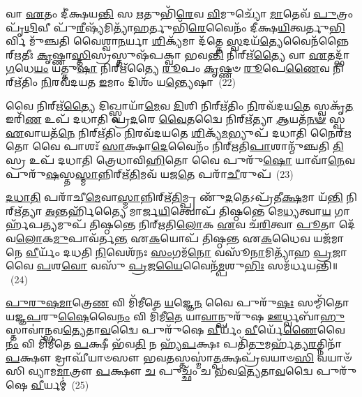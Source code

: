𑌵𑌾 \ul{𑌏}\-𑌤𑌂 𑌦𑍀॑𑌕𑍍𑌷𑌯\-\ul{𑌨𑍍𑌤𑌿} 𑌸 \ul{𑌋}\-𑌤𑍁𑌭𑌿᳴\-\ul{𑌰𑍇}\-𑌵 \ul{𑌵𑌿}\-𑌮𑍁𑌚𑍍𑌯𑍋᳴ \ul{𑌮𑌾}\-𑌤𑍇𑌵᳴ \ul{𑌪𑍁}\-𑌤𑍍𑌰𑌂 𑌪𑍃᳴\-\ul{𑌥𑌿}\-𑌵𑍀 𑌪𑍁᳴\-\ul{𑌰𑍀}\-𑌷𑍍𑌯᳴𑌮𑌿𑌤𑍍𑌯𑌾᳴\-\ul{𑌹}\-𑌰𑍍𑌤𑍁𑌭𑌿᳴\-\ul{𑌰𑍇}\-𑌵𑍈𑌨𑌂᳴ 𑌦𑍀𑌕𑍍𑌷\-\ul{𑌯𑌿}\-𑌤𑍍𑌵𑌰𑍍𑌤𑍁\-\ul{𑌭𑌿}\-𑌰𑍍𑌵𑌿 𑌮𑍁᳴𑌞𑍍𑌚𑌤𑌿 𑌵𑍈𑌶𑍍𑌵𑌾\-\ul{𑌨}\-𑌰𑍍𑌯𑌾 \ul{𑌶𑌿}\-𑌕𑍍𑌯᳴𑌮𑌾 𑌦᳴𑌤𑍍𑌤𑍇 \ul{𑌸𑍍𑌵}\-𑌦𑌯᳴\-\ul{𑌤𑍍𑌯𑍇}\-𑌵𑍈𑌨᳴𑌨𑍍𑌨𑍈𑌰𑍍\mbox{}\-\ul{𑌋}\-𑌤𑍀𑌃 \ul{𑌕𑍃}\-𑌷𑍍𑌣𑌾\-\ul{𑌸𑍍𑌤𑌿}\-𑌸𑍍𑌰𑌸𑍍𑌤𑍁𑌷᳴𑌪𑌕𑍍𑌵𑌾 𑌭𑌵\-\ul{𑌨𑍍𑌤𑌿} 𑌨𑌿𑌰𑍍\mbox{}𑌋᳴\-\ul{𑌤𑍍𑌯𑍈} 𑌵𑌾 \ul{𑌏}\-𑌤𑌦𑍍𑌭𑌾᳴\-\ul{𑌗}\-𑌧𑍇\-\ul{𑌯𑌂} 𑌯𑌤𑍍𑌤𑍁\-\ul{𑌷𑌾} 𑌨𑌿𑌰𑍍\mbox{}𑌋᳴𑌤𑍍𑌯𑍈 \ul{𑌰𑍂}\-𑌪𑌂 \ul{𑌕𑍃}\-𑌷𑍍𑌣𑍞 \ul{𑌰𑍂}\-𑌪𑍇\-\ul{𑌣𑍈}\-𑌵 𑌨𑌿𑌰𑍍\mbox{}𑌋᳴𑌤𑌿𑌂 \ul{𑌨𑌿}\-𑌰𑌵᳴𑌦𑌯𑌤 \ul{𑌇}\-𑌮𑌾𑌂 𑌦𑌿𑌶𑌂᳴ 𑌯\-\ul{𑌨𑍍𑌤𑍍𑌯𑍇}\-𑌷𑌾~(22)

𑌵𑍈 𑌨𑌿𑌰𑍍\mbox{}𑌋᳴\-\ul{𑌤𑍍𑌯𑍈} 𑌦𑌿𑌖𑍍𑌸𑍍𑌵𑌾𑌯𑌾᳴\-\ul{𑌮𑍇}\-𑌵 \ul{𑌦𑌿}\-𑌶𑌿 𑌨𑌿𑌰𑍍\mbox{}𑌋᳴𑌤𑌿𑌂 \ul{𑌨𑌿}\-𑌰𑌵᳴𑌦𑌯\-\ul{𑌤𑍇} 𑌸𑍍𑌵𑌕𑍃᳴\-\ul{𑌤} 𑌇𑌰𑌿᳴\-\ul{𑌣} 𑌉𑌪᳴ 𑌦𑌧𑌾𑌤𑌿 𑌪𑍍𑌰\-\ul{𑌦}\-𑌰𑍇 \ul{𑌵𑍈}\-𑌤𑌦𑍍𑌵𑍈 𑌨𑌿𑌰𑍍\mbox{}𑌋᳴𑌤𑍍𑌯𑌾 \ul{𑌆}\-𑌯𑌤᳴\-\ul{𑌨}\-\-\ul{𑍟} 𑌸𑍍𑌵 \ul{𑌏}\-𑌵𑌾𑌯𑌤᳴\-\ul{𑌨𑍇} 𑌨𑌿𑌰𑍍\mbox{}𑌋᳴𑌤𑌿𑌂 \ul{𑌨𑌿}\-𑌰𑌵᳴𑌦𑌯𑌤𑍇 \ul{𑌶𑌿}\-𑌕𑍍𑌯᳴\-\ul{𑌮}\-𑌭𑍍𑌯𑍁𑌪᳴ 𑌦𑌧𑌾𑌤𑌿 𑌨𑍈𑌰𑍍\mbox{}\-\ul{𑌋}\-𑌤𑍋 𑌵𑍈 𑌪𑌾𑌶𑌃᳴ \ul{𑌸𑌾}\-𑌕𑍍𑌷𑌾\-\ul{𑌦𑍇}\-𑌵𑍈𑌨𑌂᳴ 𑌨𑌿𑌰𑍍\mbox{}𑌋𑌤𑌿\-\ul{𑌪𑌾}\-𑌶𑌾𑌨𑍍𑌮𑍁᳴𑌞𑍍𑌚𑌤𑌿 \ul{𑌤𑌿}\-𑌸𑍍𑌰 𑌉𑌪᳴ 𑌦𑌧𑌾𑌤𑌿 𑌤𑍍𑌰𑍇𑌧𑌾𑌵𑌿\-\ul{𑌹𑌿}\-𑌤𑍋 𑌵𑍈 𑌪𑍁𑌰𑍁᳴\-\ul{𑌷𑍋} 𑌯𑌾𑌵𑌾᳴\-\ul{𑌨𑍇}\-𑌵 𑌪𑍁𑌰𑍁᳴\-\ul{𑌷}\-𑌸𑍍𑌤\-\ul{𑌸𑍍𑌮𑌾}\-𑌨𑍍𑌨𑌿𑌰𑍍\mbox{}𑌋᳴\-\ul{𑌤𑌿}\-𑌮𑌵᳴ 𑌯𑌜\-\ul{𑌤𑍇} 𑌪𑌰𑌾᳴\-\ul{𑌚𑍀}\-𑌰𑍁𑌪᳴~(23)

\-\ul{𑌦}\-\-\ul{𑌧𑌾}\-\-\ul{𑌤𑌿} 𑌪𑌰𑌾᳴𑌚𑍀\-\ul{𑌮𑍇}\-𑌵𑌾\-\ul{𑌸𑍍𑌮𑌾}\-𑌨𑍍𑌨𑌿𑌰𑍍\mbox{}𑌋᳴\-\ul{𑌤𑌿}\-𑌮𑍍𑌪𑍍𑌰 𑌣𑍁᳴\-\ul{𑌦}\-𑌤𑍇\-𑌽𑌪𑍍𑌰᳴𑌤𑍀\-\ul{𑌕𑍍𑌷}\-𑌮𑌾 𑌯᳴\-\ul{𑌨𑍍𑌤𑌿} 𑌨𑌿𑌰𑍍\mbox{}𑌋᳴𑌤𑍍𑌯𑌾 \ul{𑌅}\-𑌨𑍍𑌤𑌰𑍍\mbox{}𑌹𑌿᳴𑌤𑍍𑌯𑍈 𑌮𑌾𑌰𑍍𑌜\-\ul{𑌯𑌿}\-𑌤𑍍𑌵𑍋𑌪᳴ 𑌤𑌿𑌷𑍍𑌠𑌨𑍍𑌤𑍇 𑌮𑍇\-\ul{𑌧𑍍𑌯}\-𑌤𑍍𑌵𑌾\-\ul{𑌯} 𑌗𑌾𑌰𑍍\mbox{}𑌹᳴𑌪\-\ul{𑌤𑍍𑌯}\-𑌮𑍁𑌪᳴ 𑌤𑌿𑌷𑍍𑌠𑌨𑍍𑌤𑍇 𑌨𑌿𑌰𑍍\mbox{}𑌋𑌤𑌿\-\ul{𑌲𑍋}\-𑌕 \ul{𑌏}\-𑌵 𑌚᳴\-\ul{𑌰𑌿}\-𑌤𑍍𑌵𑌾 \ul{𑌪𑍂}\-𑌤𑌾 𑌦𑍇᳴𑌵\-\ul{𑌲𑍋}\-𑌕\-\ul{𑌮𑍁}\-𑌪𑌾𑌵᳴𑌰𑍍𑌤\-\ul{𑌨𑍍𑌤} 𑌏\-\ul{𑌕}\-𑌯𑍋𑌪᳴ 𑌤𑌿𑌷𑍍𑌠𑌨𑍍𑌤 𑌏\-\ul{𑌕}\-𑌧𑍈𑌵 𑌯𑌜᳴𑌮𑌾𑌨𑍇 \ul{𑌵𑍀}\-𑌰𑍍𑌯𑌂᳴ 𑌦𑌧𑌤𑌿 \ul{𑌨𑌿}\-𑌵𑍇𑌶᳴𑌨𑌃 \ul{𑌸𑌂}\-𑌗𑌮᳴\-\ul{𑌨𑍋} 𑌵𑌸𑍂᳴\-\ul{𑌨𑌾}\-𑌮𑌿𑌤𑍍𑌯𑌾᳴𑌹 \ul{𑌪𑍍𑌰}\-𑌜𑌾 𑌵𑍈 \ul{𑌪}\-𑌶\-\ul{𑌵𑍋} 𑌵𑌸𑍁᳴ \ul{𑌪𑍍𑌰}\-𑌜\-\ul{𑌯𑍈}\-𑌵𑍈𑌨᳴\-\ul{𑌮𑍍𑌪}\-𑌶𑍁\-\ul{𑌭𑌿𑌃} 𑌸𑌮᳴𑌰𑍍𑌧𑌯𑌨𑍍𑌤𑌿॥~(24)

{\anuvakamend[{\-\ul{𑌋}\-𑌤𑍁𑌭𑌿᳴\-\ul{𑌰𑍇}\-𑌷𑌾 𑌪𑌰𑌾᳴\-\ul{𑌚𑍀}\-𑌰𑍁\-\ul{𑌪𑌾}\-𑌷𑍍𑌟𑌾𑌚᳴𑌤𑍍𑌵𑌾𑌰𑌿𑍞𑌶𑌚𑍍𑌚}]}%

\-\ul{𑌪𑍁}\-\-\ul{𑌰𑍁}\-\-\ul{𑌷}\-\-\ul{𑌮𑌾}\-𑌤𑍍𑌰𑍇\-\ul{𑌣} 𑌵𑌿 𑌮𑌿᳴𑌮𑍀𑌤𑍇 \ul{𑌯}\-𑌜𑍍𑌞𑍇\-\ul{𑌨} 𑌵𑍈 𑌪𑍁𑌰𑍁᳴\-\ul{𑌷𑌃} 𑌸𑌮𑍍𑌮𑌿᳴𑌤𑍋 𑌯𑌜𑍍𑌞\-\ul{𑌪}\-𑌰𑍁\-\ul{𑌷𑍈}\-𑌵𑍈\-\ul{𑌨𑌂} 𑌵𑌿 𑌮𑌿᳴𑌮𑍀\-\ul{𑌤𑍇} 𑌯𑌾\-\ul{𑌵𑌾}\-𑌨𑍍𑌪𑍁𑌰𑍁᳴𑌷 \ul{𑌊}\-𑌰𑍍𑌧𑍍𑌵𑌬𑌾᳴\-\ul{𑌹𑍁}\-𑌸𑍍𑌤𑌾𑌵𑌾॑𑌨𑍍𑌭𑌵\-\-\ul{𑌤𑍍𑌯𑍇}\-𑌤𑌾\-\ul{𑌵}\-𑌦𑍍𑌵𑍈 𑌪𑍁𑌰𑍁᳴𑌷𑍇 \ul{𑌵𑍀}\-𑌰𑍍𑌯𑌂᳴ \ul{𑌵𑍀}\-𑌰𑍍𑌯𑍇᳴\-\ul{𑌣𑍈}\-𑌵𑍈\-\ul{𑌨𑌂} 𑌵𑌿 𑌮𑌿᳴𑌮𑍀𑌤𑍇 \ul{𑌪}\-𑌕𑍍𑌷𑍀 𑌭᳴𑌵\-\ul{𑌤𑌿} 𑌨 𑌹𑍍𑌯᳴\-\ul{𑌪}\-𑌕𑍍𑌷𑌃 𑌪𑌤𑌿᳴\-\ul{𑌤𑍁}\-𑌮𑌰𑍍\mbox{}𑌹᳴𑌤𑍍𑌯\-\ul{𑌰}\-𑌤𑍍𑌨𑌿𑌨𑌾᳴ \ul{𑌪}\-𑌕𑍍𑌷𑍗 𑌦𑍍𑌰𑌾𑌘𑍀᳴𑌯𑌾𑍞𑌸𑍗 𑌭𑌵\-\ul{𑌤}\-𑌸𑍍𑌤𑌸𑍍𑌮𑌾॑\-\ul{𑌤𑍍𑌪}\-𑌕𑍍𑌷𑌪𑍍𑌰᳴𑌵𑌯𑌾𑍞\-\ul{𑌸𑌿} 𑌵𑌯𑌾𑍞᳴𑌸𑌿 𑌵𑍍𑌯𑌾𑌮\-\ul{𑌮𑌾}\-𑌤𑍍𑌰𑍗 \ul{𑌪}\-𑌕𑍍𑌷𑍗 \ul{𑌚} 𑌪𑍁𑌚𑍍𑌛𑌂᳴ 𑌚 𑌭𑌵\-\ul{𑌤𑍍𑌯𑍇}\-𑌤𑌾\-\ul{𑌵}\-𑌦𑍍𑌵𑍈 𑌪𑍁𑌰𑍁᳴𑌷𑍇 \ul{𑌵𑍀}\-𑌰𑍍𑌯𑌮𑍍॑~(25)

